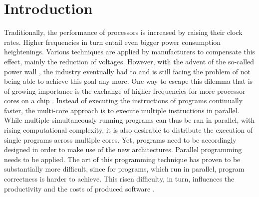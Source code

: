 \chapter{Introduction}
Traditionally, the performance of processors is increased by raising their clock rates. Higher frequencies in turn entail even bigger power consumption heightenings. Various techniques are applied by manufacturers to compensate this effect, mainly the reduction of voltages. However, with the advent of the so-called power wall \cite{LocalizingGlobalsAndStatics}, the industry eventually had to and is still facing the problem of not being able to achieve this goal any more. One way to escape this dilemma that is of growing importance is the exchange of higher frequencies for more processor cores on a chip \cite{CPUScaling}. Instead of executing the instructions of programs continually faster, the multi-core approach is to execute multiple instructions in parallel. While multiple simultaneously running programs can thus be ran in parallel, with rising computational complexity, it is also desirable to distribute the execution of single programs across multiple cores. Yet, programs need to be accordingly designed in order to make use of the new architectures. Parallel programming needs to be applied. The art of this programming technique has proven to be substantially more difficult, since for programs, which run in parallel, program correctness is harder to achieve. This risen difficulty, in turn, influences the productivity and the costs of produced software \cite{ParallelProgrammerProductivity}.

